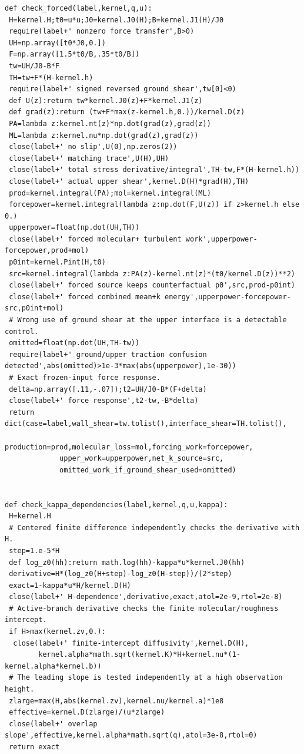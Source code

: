 \documentclass[11pt,a4paper]{article}
\numberwithin{equation}{section}
\begin{document}
\begin{lstlisting}[caption={Standalone wall-equation and coefficient-consistency checks.}]
def check_forced(label,kernel,q,u):
 H=kernel.H;t0=u*u;J0=kernel.J0(H);B=kernel.J1(H)/J0
 require(label+' nonzero force transfer',B>0)
 UH=np.array([t0*J0,0.])
 F=np.array([1.5*t0/B,.35*t0/B])
 tw=UH/J0-B*F
 TH=tw+F*(H-kernel.h)
 require(label+' signed reversed ground shear',tw[0]<0)
 def U(z):return tw*kernel.J0(z)+F*kernel.J1(z)
 def grad(z):return (tw+F*max(z-kernel.h,0.))/kernel.D(z)
 PA=lambda z:kernel.nt(z)*np.dot(grad(z),grad(z))
 ML=lambda z:kernel.nu*np.dot(grad(z),grad(z))
 close(label+' no slip',U(0),np.zeros(2))
 close(label+' matching trace',U(H),UH)
 close(label+' total stress derivative/integral',TH-tw,F*(H-kernel.h))
 close(label+' actual upper shear',kernel.D(H)*grad(H),TH)
 prod=kernel.integral(PA);mol=kernel.integral(ML)
 forcepower=kernel.integral(lambda z:np.dot(F,U(z)) if z>kernel.h else 0.)
 upperpower=float(np.dot(UH,TH))
 close(label+' forced molecular+ turbulent work',upperpower-forcepower,prod+mol)
 p0int=kernel.Pint(H,t0)
 src=kernel.integral(lambda z:PA(z)-kernel.nt(z)*(t0/kernel.D(z))**2)
 close(label+' forced source keeps counterfactual p0',src,prod-p0int)
 close(label+' forced combined mean+k energy',upperpower-forcepower-src,p0int+mol)
 # Wrong use of ground shear at the upper interface is a detectable control.
 omitted=float(np.dot(UH,TH-tw))
 require(label+' ground/upper traction confusion detected',abs(omitted)>1e-3*max(abs(upperpower),1e-30))
 # Exact frozen-input force response.
 delta=np.array([.11,-.07]);t2=UH/J0-B*(F+delta)
 close(label+' force response',t2-tw,-B*delta)
 return dict(case=label,wall_shear=tw.tolist(),interface_shear=TH.tolist(),
             production=prod,molecular_loss=mol,forcing_work=forcepower,
             upper_work=upperpower,net_k_source=src,
             omitted_work_if_ground_shear_used=omitted)


def check_kappa_dependencies(label,kernel,q,u,kappa):
 H=kernel.H
 # Centered finite difference independently checks the derivative with H.
 step=1.e-5*H
 def log_z0(hh):return math.log(hh)-kappa*u*kernel.J0(hh)
 derivative=H*(log_z0(H+step)-log_z0(H-step))/(2*step)
 exact=1-kappa*u*H/kernel.D(H)
 close(label+' H-dependence',derivative,exact,atol=2e-9,rtol=2e-8)
 # Active-branch derivative checks the finite molecular/roughness intercept.
 if H>max(kernel.zv,0.):
  close(label+' finite-intercept diffusivity',kernel.D(H),
        kernel.alpha*math.sqrt(kernel.K)*H+kernel.nu*(1-kernel.alpha*kernel.b))
 # The leading slope is tested independently at a high observation height.
 zlarge=max(H,abs(kernel.zv),kernel.nu/kernel.a)*1e8
 effective=kernel.D(zlarge)/(u*zlarge)
 close(label+' overlap slope',effective,kernel.alpha*math.sqrt(q),atol=3e-8,rtol=0)
 return exact


\end{lstlisting}
\end{document}
